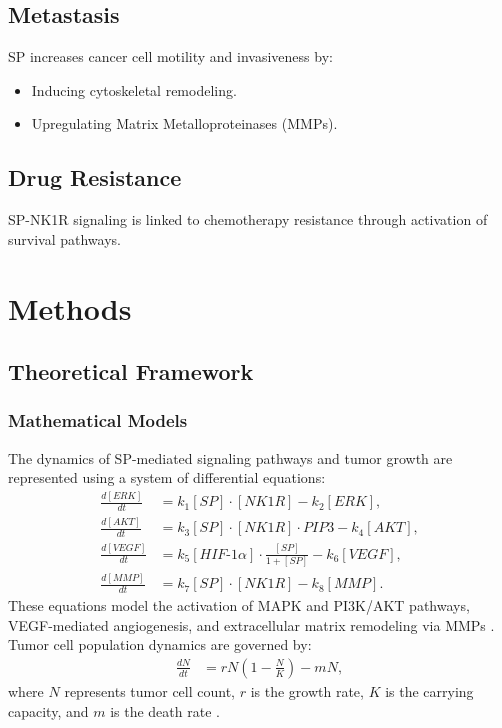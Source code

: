 \documentclass{article}
\theoremstyle{plain}
\theoremstyle{definition}
\begin{document}
\subsection{Metastasis}
SP increases cancer cell motility and invasiveness by:
\begin{itemize}
    \item Inducing cytoskeletal remodeling.
    \item Upregulating Matrix Metalloproteinases (MMPs).
\end{itemize}

\subsection{Drug Resistance}
SP-NK1R signaling is linked to chemotherapy resistance through activation of survival pathways.

\section{Methods}

\subsection{Theoretical Framework}

\subsubsection{Mathematical Models}
The dynamics of SP-mediated signaling pathways and tumor growth are represented using a system of differential equations:
\begin{align}
    \frac{d[ERK]}{dt} &= k_1[SP] \cdot [NK1R] - k_2[ERK], \\
    \frac{d[AKT]}{dt} &= k_3[SP] \cdot [NK1R] \cdot PIP3 - k_4[AKT], \\
    \frac{d[VEGF]}{dt} &= k_5[HIF\text{-}1\alpha] \cdot \frac{[SP]}{1 + [SP]} - k_6[VEGF], \\
    \frac{d[MMP]}{dt} &= k_7[SP] \cdot [NK1R] - k_8[MMP].
\end{align}
These equations model the activation of MAPK and PI3K/AKT pathways, VEGF-mediated angiogenesis, and extracellular matrix remodeling via MMPs \cite{williams2020angiogenesis, miller2018mmp}. Tumor cell population dynamics are governed by:
\begin{align}
    \frac{dN}{dt} &= rN\left(1 - \frac{N}{K}\right) - mN,
\end{align}
where \( N \) represents tumor cell count, \( r \) is the growth rate, \( K \) is the carrying capacity, and \( m \) is the death rate \cite{kim2019modeling}.
\end{document}
